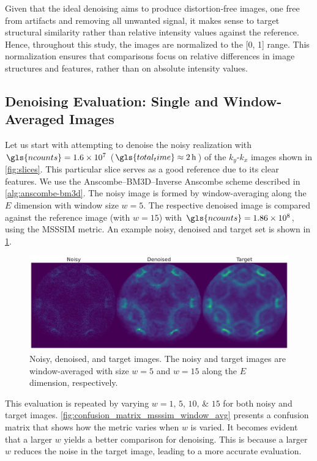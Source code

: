 Given that the ideal denoising aims to produce distortion-free images, one free from artifacts and removing all unwanted signal, it makes sense to target structural similarity rather than relative intensity values against the reference. Hence, throughout this study, the images are normalized to the [\num{0}, \num{1}] range. This normalization ensures that comparisons focus on relative differences in image structures and features, rather than on absolute intensity values.

\subsection{Denoising Evaluation: Single and Window-Averaged Images}
Let us start with attempting to denoise the noisy realization with $\gls{ncounts}=\num{1.6e7}$ ($\gls{total_time}\approx\qty{2}{h}$) of the $k_y$-$k_x$ images shown in \cref{fig:slices}. This particular slice serves as a good reference due to its clear features. We use the Anscombe--\gls{BM3D}--Inverse Anscombe scheme described in \cref{alg:anscombe-bm3d}. The noisy image is formed by window-averaging along the $E$ dimension with window size $w = 5$. The respective denoised image is compared against the reference image (with $w=15$) with $\gls{ncounts}=\num{1.86e8}$, using the \gls{MSSSIM} metric. An example noisy, denoised and target set is shown in \cref{fig:noisy-denoised-ref-16M-avg-bm3d}. 

\begin{figure}
    \centering
    \includegraphics[width=1\linewidth]{images/noisy_denoised_ref_16M_avg_bm3d.pdf}
    \caption{Noisy, denoised, and target images. The noisy and target images are window-averaged with size $w=5$ and $w=15$ along the $E$ dimension, respectively.}
    \label{fig:noisy-denoised-ref-16M-avg-bm3d}
\end{figure}

This evaluation is repeated by varying $w = \numlist{1;5;10;15}$  for both noisy and target images. \cref{fig:confusion_matrix_msssim_window_avg} presents a confusion matrix that shows how the metric varies when $w$ is varied. It becomes evident that a larger $w$ yields a better comparison for denoising. This is because a larger $w$ reduces the noise in the target image, leading to a more accurate evaluation.

